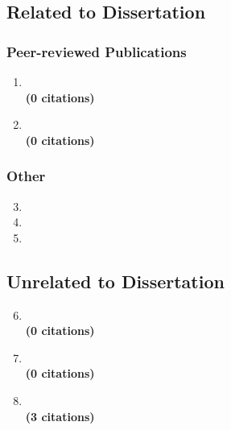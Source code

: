 \documentclass[12pt, a4paper]{book}
\begin{document}
\ListOfPublications{}

\subsection*{Related to Dissertation}
\subsubsection*{Peer-reviewed Publications}

\begin{enumerate}
  \item {} \\
  \textbf{(0 citations)}
  \item {} \\
  \textbf{(0 citations)}
\end{enumerate}

\subsubsection*{Other}
\begin{enumerate}
  \setcounter{enumi}{2}
  \item {}
  \item {}
  \item {}
\end{enumerate}

\clearpage

\subsection*{Unrelated to Dissertation}

\begin{enumerate}
  \setcounter{enumi}{5}
  \item {} \\
  \textbf{(0 citations)}
  \item {} \\
  \textbf{(0 citations)}
  \item {} \\
  \textbf{(3 citations)}
\end{enumerate}
\end{document}
